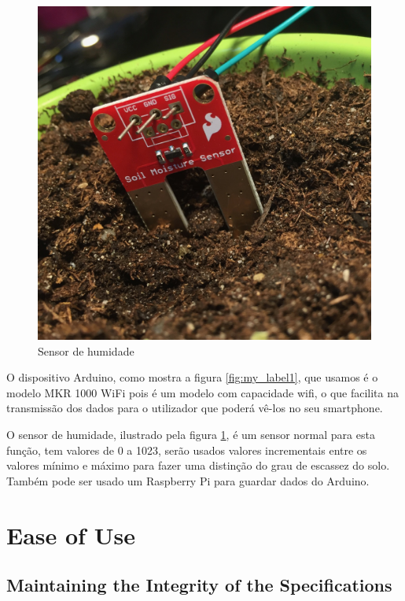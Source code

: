 \documentclass[conference]{IEEEtran}
\begin{document}
\begin{figure}
    \includegraphics[scale=0.1]{sensor.jpg}
    \caption{Sensor de humidade}
    \label{fig:my_label2}
\end{figure}

O dispositivo Arduino, como mostra a figura \ref{fig:my_label1}, que usamos é o 
modelo MKR 1000 WiFi pois é um modelo com capacidade wifi, o que facilita na 
transmissão dos dados para o utilizador que poderá vê-los no seu smartphone. 

O sensor de humidade, ilustrado pela figura \ref{fig:my_label2}, é um 
sensor normal para esta função, tem valores de 0 a 1023, serão usados valores 
incrementais entre os valores mínimo e máximo para fazer uma distinção do grau 
de escassez do solo. Também pode ser usado um Raspberry Pi para guardar dados do Arduino.










\section{Ease of Use}

\subsection{Maintaining the Integrity of the Specifications}
\end{document}
